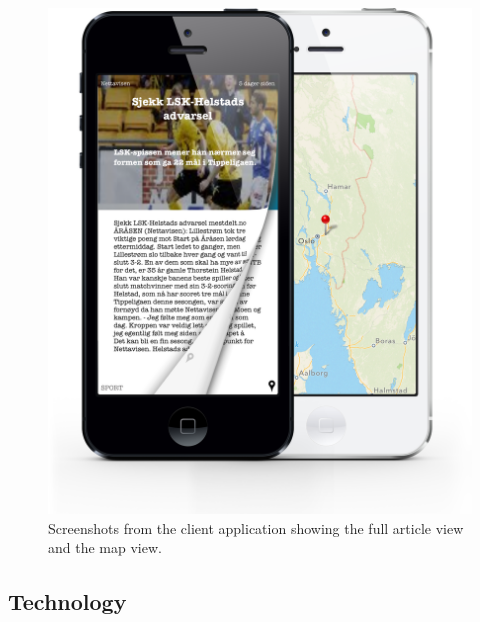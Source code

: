 \begin{figure}[!htbp]
\centering
\includegraphics[width=120mm]{GFX/clientApp/swipeForSimilarAndMap.png}
\caption{Screenshots from the client application showing the full article view and the map view.}
\label{screenshots_nyhetene_full_article_and_map}
\end{figure}













\subsection{Technology}
